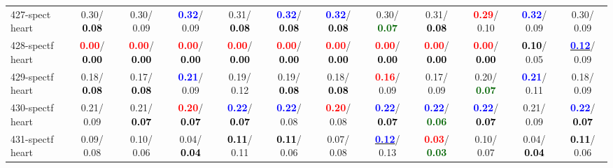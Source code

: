 \begin{table}[h]
\begin{center}
{\begin{tabular}{lc|c|c|c|c|c|c|c|c|c|c}
427-spect heart &   0.30/\textcolor{black}{\textbf{  0.08}} &   0.30/  0.09 & \textcolor{blue}{\textbf{  0.32}}/  0.09 &   0.31/\textcolor{black}{\textbf{  0.08}} & \textcolor{blue}{\textbf{  0.32}}/\textcolor{black}{\textbf{  0.08}} & \textcolor{blue}{\textbf{  0.32}}/\textcolor{black}{\textbf{  0.08}} &   0.30/\textcolor{darkgreen}{\textbf{  0.07}} &   0.31/\textcolor{black}{\textbf{  0.08}} & \textcolor{red}{\textbf{  0.29}}/  0.10 & \textcolor{blue}{\textbf{  0.32}}/  0.09 &   0.30/  0.09 \\
428-spectf heart & \textcolor{red}{\textbf{  0.00}}/\textcolor{black}{\textbf{  0.00}} & \textcolor{red}{\textbf{  0.00}}/\textcolor{black}{\textbf{  0.00}} & \textcolor{red}{\textbf{  0.00}}/\textcolor{black}{\textbf{  0.00}} & \textcolor{red}{\textbf{  0.00}}/\textcolor{black}{\textbf{  0.00}} & \textcolor{red}{\textbf{  0.00}}/\textcolor{black}{\textbf{  0.00}} & \textcolor{red}{\textbf{  0.00}}/\textcolor{black}{\textbf{  0.00}} & \textcolor{red}{\textbf{  0.00}}/\textcolor{black}{\textbf{  0.00}} & \textcolor{red}{\textbf{  0.00}}/\textcolor{black}{\textbf{  0.00}} & \textcolor{red}{\textbf{  0.00}}/\textcolor{black}{\textbf{  0.00}} & \textcolor{black}{\textbf{  0.10}}/  0.05 & \underline{\textcolor{blue}{\textbf{  0.12}}}/  0.09 \\
429-spectf heart &   0.18/\textcolor{black}{\textbf{  0.08}} &   0.17/\textcolor{black}{\textbf{  0.08}} & \textcolor{blue}{\textbf{  0.21}}/  0.09 &   0.19/  0.12 &   0.19/\textcolor{black}{\textbf{  0.08}} &   0.18/\textcolor{black}{\textbf{  0.08}} & \textcolor{red}{\textbf{  0.16}}/  0.09 &   0.17/  0.09 &   0.20/\textcolor{darkgreen}{\textbf{  0.07}} & \textcolor{blue}{\textbf{  0.21}}/  0.11 &   0.18/  0.09 \\
430-spectf heart &   0.21/  0.09 &   0.21/\textcolor{black}{\textbf{  0.07}} & \textcolor{red}{\textbf{  0.20}}/\textcolor{black}{\textbf{  0.07}} & \textcolor{blue}{\textbf{  0.22}}/\textcolor{black}{\textbf{  0.07}} & \textcolor{blue}{\textbf{  0.22}}/  0.08 & \textcolor{red}{\textbf{  0.20}}/  0.08 & \textcolor{blue}{\textbf{  0.22}}/\textcolor{black}{\textbf{  0.07}} & \textcolor{blue}{\textbf{  0.22}}/\textcolor{darkgreen}{\textbf{  0.06}} & \textcolor{blue}{\textbf{  0.22}}/\textcolor{black}{\textbf{  0.07}} &   0.21/  0.09 & \textcolor{blue}{\textbf{  0.22}}/\textcolor{black}{\textbf{  0.07}} \\ \hline
431-spectf heart &   0.09/  0.08 &   0.10/  0.06 &   0.04/\textcolor{black}{\textbf{  0.04}} & \textcolor{black}{\textbf{  0.11}}/  0.11 & \textcolor{black}{\textbf{  0.11}}/  0.06 &   0.07/  0.08 & \underline{\textcolor{blue}{\textbf{  0.12}}}/  0.13 & \textcolor{red}{\textbf{  0.03}}/\textcolor{darkgreen}{\textbf{  0.03}} &   0.10/  0.07 &   0.04/\textcolor{black}{\textbf{  0.04}} & \textcolor{black}{\textbf{  0.11}}/  0.06 \\

\end{tabular}}
\end{center}
\end{table}
